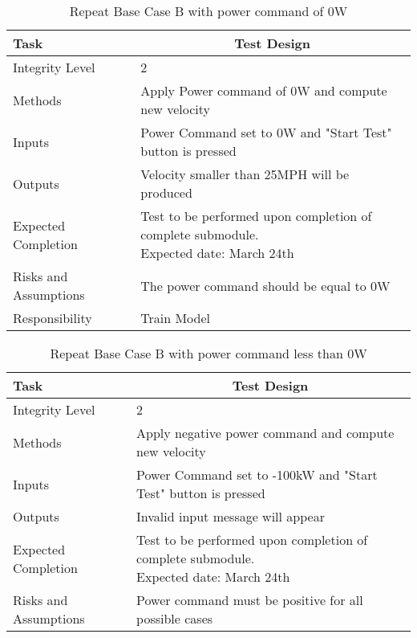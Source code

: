 \documentclass[]{article}
\begin{document}
	\begin{table}[H]
		\centering
		\caption{Repeat Base Case B with power command of 0W }
		\begin{tabular}{|l|l|}
			\hline
			Task & \multicolumn{1}{c|}{Test Design} \\ \hline
			Integrity Level & 2 \\ \hline
			Methods & Apply Power command of 0W and compute new velocity  \\ \hline
			Inputs &  Power Command set to 0W and "Start Test" button is pressed \\ \hline
			Outputs &  Velocity smaller than 25MPH will be produced  \\ \hline
			Expected Completion & \parbox[t]{10cm}{Test to be performed upon completion of complete submodule.\\ Expected date: March 24th}\\ \hline
			Risks and Assumptions & The power command should be equal to 0W \\ \hline
			Responsibility & Train Model\\ \hline
		\end{tabular}
	\end{table}

	\begin{table}[H]
		\centering
		\caption{Repeat Base Case B with power command less than 0W }
		\begin{tabular}{|l|l|}
			\hline
			Task & \multicolumn{1}{c|}{Test Design} \\ \hline
			Integrity Level & 2 \\ \hline
			Methods & Apply negative power command and compute new velocity  \\ \hline
			Inputs &  Power Command set to -100kW and "Start Test" button is pressed \\ \hline
			Outputs &  Invalid input message will appear  \\ \hline
			Expected Completion & \parbox[t]{10cm}{Test to be performed upon completion of complete submodule.\\ Expected date: March 24th}\\ \hline
			Risks and Assumptions & Power command must be positive for all possible cases\\ \hline
		\end{tabular}
	\end{table}
\end{document}
